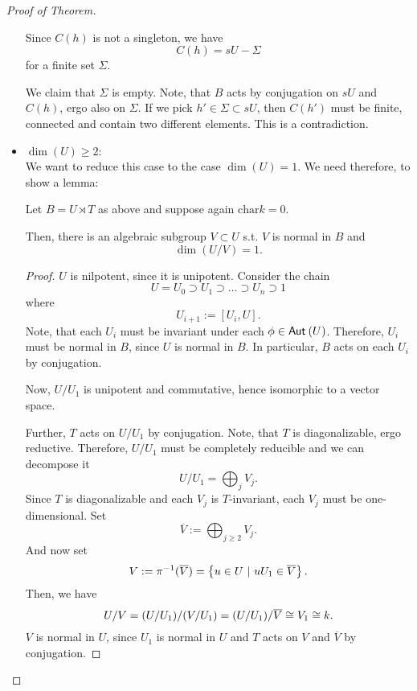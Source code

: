 \begin{proof}[Proof of Theorem]
\begin{itemize}
		Since $C(h)$ is not a singleton, we have
		\[ C(h) = sU  - \Sigma \]
		for a finite set $\Sigma$.
		
		We claim that $\Sigma$ is empty. Note, that $B$ acts by conjugation on $sU$ and $C(h)$, ergo also on $\Sigma$. If we pick $h' \in \Sigma \subset sU$, then $C(h')$ must be finite, connected and contain two different elements. This is a contradiction.
		\item $\dim(U) \geq 2$:\\
		We want to reduce this case to the case $\dim (U) = 1$. We need therefore, to show a lemma:
		\begin{lemma}
			Let $B = U \rtimes T$ as above and suppose again $\mathrm{char} k = 0$.
			
			Then, there is an algebraic subgroup $V \subset U$ s.t. $V$ is normal in $B$ and
			\[ \dim(U/V) = 1. \]
		\end{lemma}
	\begin{proof}
		$U$ is nilpotent, since it is unipotent.
		Consider the chain
		\[ U = U_0 \supset U_1 \supset \ldots \supset U_n \supset 1 \]
		where
		\[ U_{i+1} := [U_i, U]. \]
		Note, that each $U_i$ must be invariant under each $\phi \in \textsf{Aut}_{}\left(U\right)$. Therefore, $U_i$ must be normal in $B$, since
		 $U$ is normal in $B$. In particular, $B$ acts on each $U_i$ by conjugation.
		
		Now, $U/U_1$ is unipotent and commutative, hence isomorphic to a vector space.
		
		Further, $T$ acts on $U/U_1$ by conjugation. Note, that $T$ is diagonalizable, ergo reductive. Therefore, $U/U_1$ must be completely reducible and we can decompose it
		\[ U/U_1 = \bigoplus_j V_j. \]
		Since $T$ is diagonalizable and each $V_j$ is $T$-invariant, each $V_j$ must be one-dimensional. Set
		\[ \overline{V} := \bigoplus_{j \geq 2} V_j. \]
		And now set
		\[ V := \pi^{-1}(\overline{V}) = \left\lbrace u \in U ~ | ~ uU_1 \in \overline{V}\right\rbrace. \]
		Then, we have
		\[ U/V = (U/U_1) / (V / U_1) = ( U / U_1) / \overline{V} \overset{}{\cong} V_1 \overset{}{\cong} k. \]
		$V$ is normal in $U$, since $U_1$ is normal in $U$ and $T$ acts on $V$ and $\overline{V}$ by conjugation.
	\end{proof}


\end{itemize}
\end{proof}
